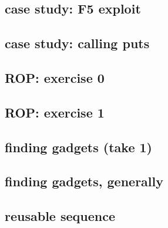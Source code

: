 \subsection{case study: F5 exploit}


\subsection{case study: calling puts}


\subsection{ROP: exercise 0}


\subsection{ROP: exercise 1}


\subsection{finding gadgets (take 1)}


\subsection{finding gadgets, generally}



\subsection{reusable sequence}




